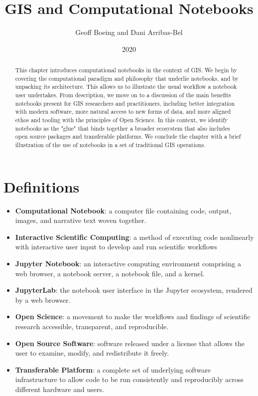 \documentclass[11pt,letterpaper]{article}
\title{GIS and Computational Notebooks}
\author{Geoff Boeing and Dani Arribas-Bel}
\date{2020}
\begin{document}
\maketitle

\begin{abstract}
This chapter introduces computational notebooks in the context of GIS. We begin by covering the computational paradigm and philosophy that underlie notebooks, and by unpacking its architecture. This allows us to illustrate the usual workflow a notebook user undertakes.
%
From description, we move on to a discussion of the main benefits notebooks present for GIS researchers and practitioners, including better integration with modern software, more natural access to new forms of data, and more aligned ethos and tooling with the principles of Open Science. In this context, we identify notebooks as the "glue" that binds together a broader ecosystem that also includes open source packages and transferable platforms. 
%
We conclude the chapter with a brief illustration of the use of notebooks in a set of traditional GIS operations.
\end{abstract}

\section*{Definitions}

\begin{itemize}
    \item \textbf{Computational Notebook}: a computer file containing code, output, images, and narrative text woven together.
    \item \textbf{Interactive Scientific Computing}: a method of executing code nonlinearly with interactive user input to develop and run scientific workflows
    \item \textbf{Jupyter Notebook}: an interactive computing environment comprising a web browser, a notebook server, a notebook file, and a kernel.
    \item \textbf{JupyterLab}: the notebook user interface in the Jupyter ecosystem, rendered by a web browser.
    \item \textbf{Open Science}: a movement to make the workflows and findings of scientific research accessible, transparent, and reproducible.
    \item \textbf{Open Source Software}: software released under a license that allows the user to examine, modify, and redistribute it freely.
    \item \textbf{Transferable Platform}: a complete set of underlying software infrastructure to allow code to be run consistently and reproducibly across different hardware and users.
\end{itemize}
\end{document}
